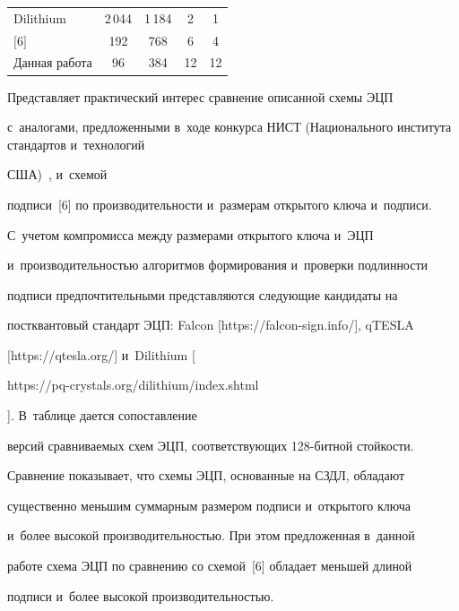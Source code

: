 \begin{table}
\begin{center}
\begin{tabular}{|l|c|c|c|c|}
Dilithium&2\,044&1\,184&2&1\\


$[$6$]$&\hphantom{2\,}192&\hphantom{2\,}768&6&4\\


Данная работа&\hphantom{22\,}96&\hphantom{2\,}384&12\hphantom{9}&12\hphantom{9}\\


\hline


\end{tabular}


\end{center}


\end{table}





   


   Представляет практический интерес сравнение описанной схемы ЭЦП 


с~аналогами, предложенными в~ходе конкурса НИСТ (Национального института стандартов и~технологий


США)~\cite{3-m}, и~схемой 


подписи~[6] по производительности и~размерам открытого ключа и~подписи. 


С~учетом компромисса между размерами открытого ключа и~ЭЦП 


и~производительностью алгоритмов формирования и~проверки подлинности 


подписи предпочтительными представляются следующие кандидаты на 


постквантовый стандарт ЭЦП: Falcon [{\sf https://falcon-sign.info/}], qTESLA 


[{\sf https://qtesla.org/}] и~Dilithium [{\sf  


https://pq-crystals.org/dilithium/index.shtml}]. В~таблице дается сопоставление 


версий сравниваемых схем ЭЦП, соответствующих 128-бит\-ной стойкости. 


Сравнение показывает, что схемы ЭЦП, основанные на СЗДЛ, обладают 


существенно меньшим суммарным размером подписи и~открытого ключа 


и~более высокой производительностью. При этом предложенная в~данной 


работе схема ЭЦП по сравнению со схемой~[6] обладает меньшей длиной 


подписи и~более высокой производительностью. 



